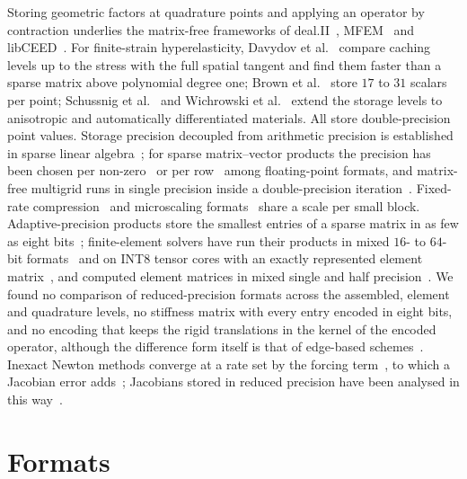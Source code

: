 \documentclass[sigconf,review]{acmart}
\begin{document}
Storing geometric factors at quadrature points and applying an operator by contraction underlies
the matrix-free frameworks of deal.II~\cite{KronbichlerKormann2012}, MFEM~\cite{MFEM2021} and
libCEED~\cite{libCEED2021}.  For finite-strain hyperelasticity, Davydov et
al.~\cite{Davydov2020} compare caching levels up to the stress with the full spatial tangent and
find them faster than a sparse matrix above polynomial degree one; Brown et al.~\cite{Brown2022}
store $17$ to $31$ scalars per point; Schussnig et al.~\cite{Schussnig2025} and Wichrowski et
al.~\cite{Wichrowski2025} extend the storage levels to anisotropic and automatically differentiated
materials.  All store double-precision point values.  Storage precision decoupled from arithmetic
precision is established in sparse linear algebra~\cite{Anzt2019,Gruetzmacher2023,HighamMary2022};
for sparse matrix--vector products the precision has been chosen per non-zero~\cite{Ahmad2019} or
per row~\cite{Tezcan2022} among floating-point formats, and matrix-free multigrid runs in single
precision inside a double-precision iteration~\cite{KronbichlerLjungkvist2019}.  Fixed-rate
compression~\cite{Lindstrom2014} and microscaling formats~\cite{Rouhani2023} share a scale per small
block.  Adaptive-precision products store the smallest entries of a sparse matrix in as few as
eight bits~\cite{Graillat2024}; finite-element solvers have run their products in mixed $16$- to
$64$-bit formats~\cite{Ichimura2018} and on INT8 tensor cores with an exactly represented element
matrix~\cite{Ichimura2024}, and computed element matrices in mixed single and half
precision~\cite{CrociWells2024}.  We found no comparison of reduced-precision formats across the
assembled, element and quadrature levels, no stiffness matrix with every entry encoded in eight
bits, and no encoding that keeps the rigid translations in the kernel of the encoded operator,
although the difference form itself is that of edge-based schemes~\cite{Lohner2008}.  Inexact Newton methods converge at a rate set
by the forcing term~\cite{DemboEisenstatSteihaug1982}, to which a Jacobian error
adds~\cite{Kelley2018,Catinas2001}; Jacobians stored in reduced precision have been analysed in this
way~\cite{Kelley2022}.

\section{Formats}
\end{document}

